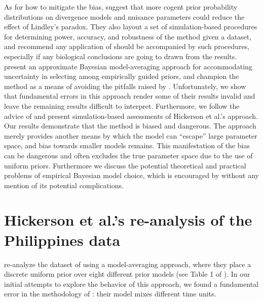 \documentclass[letterpaper,12pt]{article}
\begin{document}
\begin{linenumbers}
As for how to mitigate the bias, \citet{Oaks2012} suggest that more cogent
prior probability distributions on divergence models and nuisance parameters
could reduce the effect of Lindley's paradox.
They also layout a set of simulation-based procedures for determining power,
accuracy, and robustness of the method given a dataset, and recommend any
application of \msb should be accompanied by such procedures, especially
if any biological conclusions are going to drawn from the results.
\citet{Hickerson2013} present an approximate Bayesian model-averaging approach
for accommodating uncertainty in selecting among empirically guided priors, and
champion the method as a means of avoiding the pitfalls raised by
\citet{Oaks2012}.
Unfortunately, we show that fundamental errors in this approach render some of
their results invalid and leave the remaining results difficult to interpret.
Furthermore, we follow the advice of \citet{Oaks2012} and present
simulation-based assessments of Hickerson et al.'s \citeyear{Hickerson2013}
approach.
Our results demonstrate that the method is biased and dangerous.  The approach
merely provides another means by which the model can ``escape'' large parameter
space, and bias towards smaller models remains.
This manifestation of the bias can be dangerous and often excludes the true
parameter space due to the use of uniform priors.
Furthermore we discuss the potential theoretical and practical problems of
empirical Bayesian model choice, which is encouraged by \citet{Hickerson2013}
without any mention of its potential complications.




\section*{Hickerson et al.'s re-analysis of the Philippines data}
\citet{Hickerson2013} re-analyze the dataset of \citet{Oaks2012} using a
model-averaging approach, where they place a discrete uniform prior over eight
different prior models (see Table 1 of \citet{Hickerson2013}).
In our initial attempts to explore the behavior of this approach, we found
a fundamental error in the methodology of \citet{Hickerson2013}:
their model mixes different time units.


\end{linenumbers}
\end{document}
